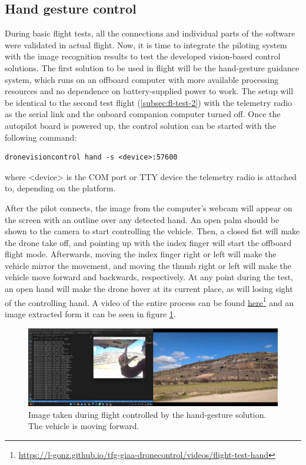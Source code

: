 \subsection{Hand gesture control}
\label{subsec:fl-test-4}


During basic flight tests, all the connections and individual parts of the software were validated in actual flight.
Now, it is time to integrate the piloting system with the image recognition results to test the developed vision-based control solutions.
The first solution to be used in flight will be the hand-gesture guidance system, which runs on an offboard computer with more available processing resources and no dependence on battery-supplied power to work.
The setup will be identical to the second test flight (\ref{subsec:fl-test-2}) with the telemetry radio as the serial link and the onboard companion computer turned off.
Once the autopilot board is powered up, the control solution can be started with the following command:
\begin{verbatim}
dronevisioncontrol hand -s <device>:57600
\end{verbatim}
where <device> is the COM port or TTY device the telemetry radio is attached to, depending on the platform.


After the pilot connects, the image from the computer's webcam will appear on the screen with an outline over any detected hand.
An open palm should be shown to the camera to start controlling the vehicle.
Then, a closed fist will make the drone take off, and pointing up with the index finger will start the offboard flight mode.
Afterwards, moving the index finger right or left will make the vehicle mirror the movement, 
and moving the thumb right or left will make the vehicle move forward and backwards, respectively.
At any point during the test, an open hand will make the drone hover at its current place, as will losing sight of the controlling hand.
A video of the entire process can be found \href{https://l-gonz.github.io/tfg-giaa-dronecontrol/videos/flight-test-hand}{here}\footnote{\url{https://l-gonz.github.io/tfg-giaa-dronecontrol/videos/flight-test-hand}} and an image extracted form it can be seen in figure \ref{fig:flight-test-hand}.

\begin{figure}
  \centering
  \includegraphics[width=\textwidth, keepaspectratio]{img/video-field-test-hand.png}
  \caption{Image taken during flight controlled by the hand-gesture solution. The vehicle is moving forward.}
  \label{fig:flight-test-hand}
\end{figure}

